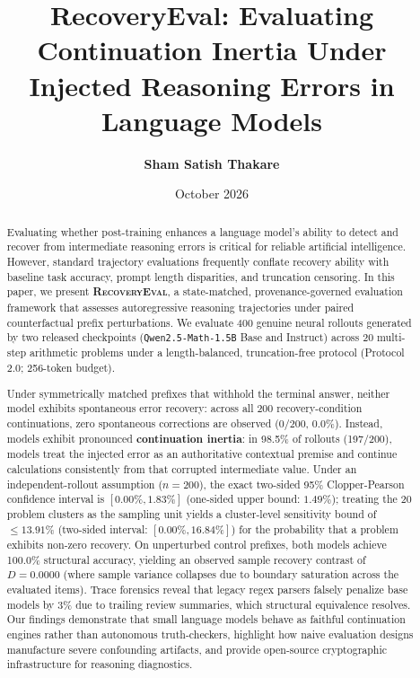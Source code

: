 \documentclass[11pt,letterpaper]{article}
\title{\textbf{\Large RecoveryEval: Evaluating Continuation Inertia Under Injected Reasoning Errors in Language Models}}
\author{\textbf{Sham Satish Thakare}}
\affil{Independent Researcher, Pune, Maharashtra, India \\ \texttt{shamthakare@gmail.com}}
\date{October 2026}
\newcommand{\modelbase}{\texttt{Qwen2.5-Math-1.5B}}
\newcommand{\framework}{\textsc{RecoveryEval}}
\begin{document}
\maketitle

\begin{abstract}
Evaluating whether post-training enhances a language model's ability to detect and recover from intermediate reasoning errors is critical for reliable artificial intelligence. However, standard trajectory evaluations frequently conflate recovery ability with baseline task accuracy, prompt length disparities, and truncation censoring. In this paper, we present \textbf{\framework}, a state-matched, provenance-governed evaluation framework that assesses autoregressive reasoning trajectories under paired counterfactual prefix perturbations. We evaluate 400 genuine neural rollouts generated by two released checkpoints (\modelbase{} Base and Instruct) across 20 multi-step arithmetic problems under a length-balanced, truncation-free protocol (Protocol 2.0; 256-token budget).

Under symmetrically matched prefixes that withhold the terminal answer, neither model exhibits spontaneous error recovery: across all 200 recovery-condition continuations, zero spontaneous corrections are observed ($0/200$, $0.0\%$). Instead, models exhibit pronounced \textbf{continuation inertia}: in 98.5\% of rollouts (197/200), models treat the injected error as an authoritative contextual premise and continue calculations consistently from that corrupted intermediate value. Under an independent-rollout assumption ($n=200$), the exact two-sided 95\% Clopper-Pearson confidence interval is $[0.00\%, 1.83\%]$ (one-sided upper bound: $1.49\%$); treating the 20 problem clusters as the sampling unit yields a cluster-level sensitivity bound of $\le 13.91\%$ (two-sided interval: $[0.00\%, 16.84\%]$) for the probability that a problem exhibits non-zero recovery. On unperturbed control prefixes, both models achieve 100.0\% structural accuracy, yielding an observed sample recovery contrast of $D = 0.0000$ (where sample variance collapses due to boundary saturation across the evaluated items). Trace forensics reveal that legacy regex parsers falsely penalize base models by 3\% due to trailing review summaries, which structural equivalence resolves. Our findings demonstrate that small language models behave as faithful continuation engines rather than autonomous truth-checkers, highlight how naive evaluation designs manufacture severe confounding artifacts, and provide open-source cryptographic infrastructure for reasoning diagnostics.
\end{abstract}
\end{document}
